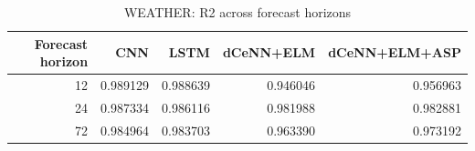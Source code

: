 \begin{table}
\caption{WEATHER: R2 across forecast horizons}
\begin{tabular}{rrrrr}
\toprule
Forecast horizon & CNN & LSTM & dCeNN+ELM & dCeNN+ELM+ASP \\
\midrule
12 & 0.989129 & 0.988639 & 0.946046 & 0.956963 \\
24 & 0.987334 & 0.986116 & 0.981988 & 0.982881 \\
72 & 0.984964 & 0.983703 & 0.963390 & 0.973192 \\
\bottomrule
\end{tabular}
\end{table}
